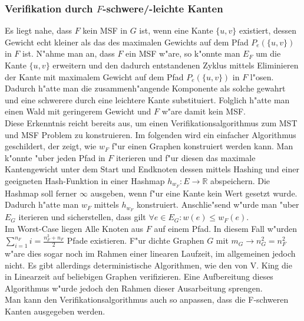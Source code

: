 \subsubsection{Verifikation durch $F$-schwere/-leichte Kanten}
\label{sec:verification}
Es liegt nahe, dass $F$ kein MSF in $G$ ist, wenn eine Kante $\{u,v\}$ 
    existiert, dessen Gewicht echt kleiner als das des maximalen Gewichts auf dem
    Pfad $P_e(\{u,v\})$ in $F$ ist. 
    N"ahme man an, dass $F$ ein MSF w"are, 
    so k"onnte man $E_F$ um die Kante $\{u,v\}$ erweitern und den dadurch 
    entstandenen Zyklus mittels Eliminieren der Kante mit maximalem Gewicht auf dem
    Pfad $P_e(\{u,v\})$ in $F$ l"osen. Dadurch h"atte man die zusammenh"angende 
    Komponente als solche gewahrt und eine schwerere durch eine leichtere Kante
    substituiert. Folglich h"atte man einen Wald mit geringerem Gewicht
    und $F$ w"are damit kein MSF.\\
Diese Erkenntnis reicht bereits aus, um einen Verifikationsalgorithmus zum 
    MST und MSF Problem zu konstruieren.
    Im folgenden wird ein einfacher Algorithmus geschildert, 
    der zeigt, wie $w_F$ f"ur einen
    Graphen konstruiert werden kann.
    Man k"onnte "uber jeden Pfad in $F$ iterieren und f"ur diesen 
    das maximale Kantengewicht unter dem Start und Endknoten dessen mittels
    Hashing und einer geeigneten Hash-Funktion in einer Hashmap 
    $h_{w_F} : E \rightarrow \mathbb{R}$ abspeichern.
    Die Hashmap soll ferner $\infty$ ausgeben, wenn f"ur eine Kante kein Wert 
    gesetzt wurde.
    Dadurch h"atte man $w_F$ mittels $h_{w_F}$ konstruiert.
    Anschlie"send w"urde man "uber $E_G$ iterieren und sicherstellen, dass gilt
    $\forall e \in E_G: w(e) \leq w_F(e)$.\\
    Im Worst-Case liegen Alle Knoten aus $F$ auf einem Pfad.
    In diesem Fall w"urden $\sum_{i=1}^{n_F} i = \frac{n_F^2+n_F}{2}$ Pfade existieren.
    F"ur dichte Graphen $G$ mit $m_G \rightarrow n_G^2 = n_F^2$ w"are dies sogar noch im Rahmen 
    einer linearen Laufzeit, im allgemeinen jedoch nicht.
    Es gibt allerdings deterministische Algorithmen, wie den von V. King 
    \cite{simpleVer}
    die in Linearzeit auf beliebigen Graphen verifizieren.
    Eine Aufbereitung dieses Algorithmus w"urde jedoch den Rahmen dieser 
    Ausarbeitung sprengen.\\
Man kann den Verifikationsalgorithmus auch so anpassen, dass die F-schweren Kanten
    ausgegeben werden.\\
